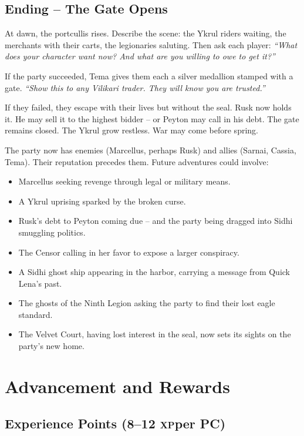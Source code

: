 \documentclass[10pt,twoside]{book}
\newcommand{\xp}{\textsc{xp}}
\begin{document}
\section{Ending -- The Gate Opens}

At dawn, the portcullis rises. Describe the scene: the Ykrul riders waiting, the merchants with their carts, the legionaries saluting. Then ask each player: \textit{``What does your character want now? And what are you willing to owe to get it?''}

If the party succeeded, Tema gives them each a silver medallion stamped with a gate. \textit{``Show this to any Vilikari trader. They will know you are trusted.''}

If they failed, they escape with their lives but without the seal. Rusk now holds it. He may sell it to the highest bidder -- or Peyton may call in his debt. The gate remains closed. The Ykrul grow restless. War may come before spring.

\begin{tipsbox}
The party now has enemies (Marcellus, perhaps Rusk) and allies (Sarnai, Cassia, Tema). Their reputation precedes them. Future adventures could involve:
\begin{itemize}
\item Marcellus seeking revenge through legal or military means.
\item A Ykrul uprising sparked by the broken curse.
\item Rusk's debt to Peyton coming due -- and the party being dragged into Sidhi smuggling politics.
\item The Censor calling in her favor to expose a larger conspiracy.
\item A Sidhi ghost ship appearing in the harbor, carrying a message from Quick Lena's past.
\item The ghosts of the Ninth Legion asking the party to find their lost eagle standard.
\item The Velvet Court, having lost interest in the seal, now sets its sights on the party's new home.
\end{itemize}
\end{tipsbox}

\chapter{Advancement and Rewards}

\section{Experience Points (8--12 \xp per PC)}
\end{document}
